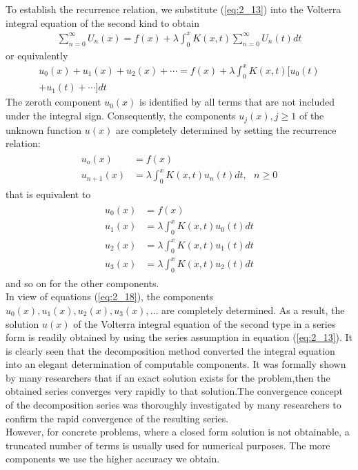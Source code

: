 \documentclass[11pt]{report}
\newcommand{\sps}{\\[0.2cm]}
\newcommand{\refn}[1]{(\ref{#1})}
\newcommand{\refx}[1]{\refn{eq:#1}}
\newcommand{\NI}{\noindent}
\begin{document}
	\NI To establish the recurrence relation, we substitute \refx{2_13} into the Volterra integral equation of the second kind to obtain
	\begin{eqnarray}
		\sum_{n=0}^{\infty} U_{n}(x)= f(x) + \lambda \int_{0}^{x} K(x,t) \sum_{n=0}^{\infty} U_{n}(t)dt
	\end{eqnarray}
	or equivalently
	\begin{multline}
		u_0(x) + u_1(x) + u_2(x) + \cdots = f(x) + \lambda \int_{0}^{x} K(x,t) [u_0(t) \\+ u_1(t) + \cdots]dt
	\end{multline}
	The zeroth component $u_0(x)$ is identified by all terms that are not included under the integral sign. Consequently, the components $u_j(x), j \geq 1$ of the unknown function $u(x)$ are completely determined by setting the recurrence relation:
	\begin{eqnarray}
		\begin{split}
				u_o(x) &= f(x)\sps
			u_{n+1}(x) &= \lambda\int_{0}^{x} K(x,t) u_n(t) dt,~~~ n \geq 0
		\end{split}
	\end{eqnarray}
	that is equivalent to
	\begin{eqnarray}
		\begin{split}
			u_0(x) &= f(x)\sps
			u_1(x) &=  \lambda\int_{0}^{x} K(x,t) u_0(t) dt\sps
			u_2(x) &=  \lambda\int_{0}^{x} K(x,t) u_1(t)dt\sps
			u_3(x) &=  \lambda\int_{0}^{x} K(x,t) u_2(t) dt
		\end{split}\label{eq:2_18}
	\end{eqnarray}
	and so on for the other components.\\
	
	\NI In view of equations \refx{2_18}, the components $u_0(x),u_1(x),u_2(x),u_3(x),\ldots$ are completely determined. As a result, the solution $u(x)$ of the Volterra integral equation of the second type in a series form is readily obtained by using the series assumption in equation \refx{2_13}. It is clearly seen that the decomposition method converted the integral equation into an elegant determination of computable components. It was formally shown by many researchers that if an exact solution exists for the problem,then the obtained series converges very rapidly to that solution.The convergence concept of the decomposition series was thoroughly investigated by many researchers to confirm the rapid convergence of the resulting series.\\ 
	\NI However, for concrete problems, where a closed form solution is not obtainable, a truncated number of terms is usually used for numerical purposes. The more components we use the higher accuracy we obtain. \\
	
\end{document}
